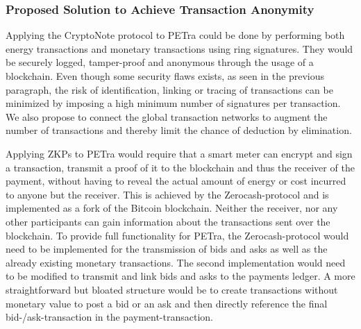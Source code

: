 \subsubsection{Proposed Solution to Achieve Transaction Anonymity}
Applying the CryptoNote protocol to PETra could be done by performing both energy transactions and monetary transactions using ring signatures. They would be securely logged, tamper-proof and anonymous through the usage of a blockchain. Even though  some security flaws exists, as seen in the previous paragraph, the risk of identification, linking or tracing of transactions can be minimized by imposing a high minimum number of signatures per transaction. We also propose to connect the global transaction networks to augment the number of transactions and thereby limit the chance of deduction by elimination.

Applying ZKPs to PETra would require that a smart meter can encrypt and sign a transaction, transmit a proof of it to the blockchain and thus the receiver of the payment, without having to reveal the actual amount of energy or cost incurred to anyone but the receiver. This is achieved by the Zerocash-protocol and is implemented as a fork of the Bitcoin blockchain. Neither the receiver, nor any other participants can gain information about the transactions sent over the blockchain. To provide full functionality for PETra, the Zerocash-protocol would need to be implemented for the transmission of bids and asks as well as the already existing monetary transactions. The second implementation would need to be modified to transmit and link bids and asks to the payments ledger. A more straightforward but bloated structure would be to create transactions without monetary value to post a bid or an ask and then directly reference the final bid-/ask-transaction in the payment-transaction. 

